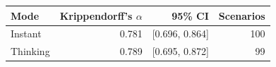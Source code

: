 \begin{tabular}{lrrr}
\toprule
Mode & Krippendorff's $\alpha$ & 95\% CI & Scenarios \\
\midrule
Instant & 0.781 & [0.696, 0.864] & 100 \\
Thinking & 0.789 & [0.695, 0.872] & 99 \\
\bottomrule
\end{tabular}